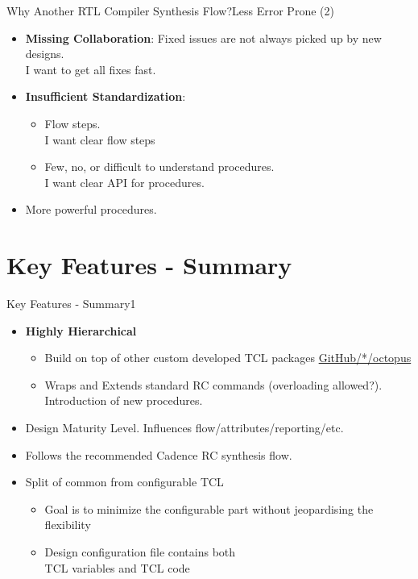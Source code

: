 \documentclass{beamer}
\begin{document}
\begin{frame}{Why Another RTL Compiler Synthesis Flow?}{Less Error Prone (2)}
	\begin{itemize}
	\item<1-> \textbf{Missing Collaboration}: Fixed issues are not always picked up by new designs. \\ \alert{I want to get all fixes fast.}
	\item<2-> \textbf{Insufficient Standardization}: 
		\begin{itemize}
		\item<2-> Flow steps.\\ \alert{I want clear flow steps}
		\item<3-> Few, no, or difficult to understand procedures. \\ \alert{I want clear API for procedures}.
		\end{itemize}
	\item<4-> More powerful procedures.
	\end{itemize}
\end{frame}


\section{Key Features - Summary}
\begin{frame}{Key Features - Summary}{1}
	\begin{itemize}[<+->]
	 \item \textbf{Highly Hierarchical}
		\begin{itemize}
		 \item Build on top of other custom developed TCL packages \href{https://github.com/octavsly/octopus}{GitHub/*/octopus}
		 \item Wraps and Extends standard RC commands (overloading allowed?). \\ Introduction of new procedures.
		\end{itemize}
	 \item \alert{Design Maturity Level}. Influences flow/attributes/reporting/etc. 
	 \item Follows the recommended Cadence RC synthesis flow.
	 \item Split of common from configurable TCL
		\begin{itemize}
		\item Goal is to minimize the configurable part without jeopardising the flexibility 
		\item \alert{Design configuration file} contains both \\ \alert{TCL variables} and \alert{TCL code}
		\end{itemize}
	\end{itemize}
\end{frame}
\end{document}
